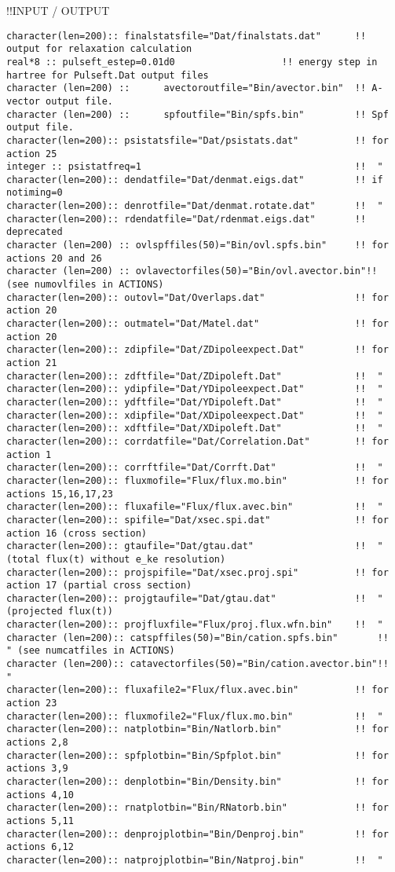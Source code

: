 !!{\large \quad INPUT / OUTPUT }
\begin{verbatim}
character(len=200):: finalstatsfile="Dat/finalstats.dat"      !! output for relaxation calculation
real*8 :: pulseft_estep=0.01d0                   !! energy step in hartree for Pulseft.Dat output files
character (len=200) ::      avectoroutfile="Bin/avector.bin"  !! A-vector output file.        
character (len=200) ::      spfoutfile="Bin/spfs.bin"         !! Spf output file.
character(len=200):: psistatsfile="Dat/psistats.dat"          !! for action 25
integer :: psistatfreq=1                                      !!  "
character(len=200):: dendatfile="Dat/denmat.eigs.dat"         !! if notiming=0
character(len=200):: denrotfile="Dat/denmat.rotate.dat"       !!  "
character(len=200):: rdendatfile="Dat/rdenmat.eigs.dat"       !! deprecated
character (len=200) :: ovlspffiles(50)="Bin/ovl.spfs.bin"     !! for actions 20 and 26 
character (len=200) :: ovlavectorfiles(50)="Bin/ovl.avector.bin"!!      (see numovlfiles in ACTIONS)
character(len=200):: outovl="Dat/Overlaps.dat"                !! for action 20
character(len=200):: outmatel="Dat/Matel.dat"                 !! for action 20
character(len=200):: zdipfile="Dat/ZDipoleexpect.Dat"         !! for action 21
character(len=200):: zdftfile="Dat/ZDipoleft.Dat"             !!  "
character(len=200):: ydipfile="Dat/YDipoleexpect.Dat"         !!  "
character(len=200):: ydftfile="Dat/YDipoleft.Dat"             !!  "
character(len=200):: xdipfile="Dat/XDipoleexpect.Dat"         !!  "
character(len=200):: xdftfile="Dat/XDipoleft.Dat"             !!  "
character(len=200):: corrdatfile="Dat/Correlation.Dat"        !! for action 1
character(len=200):: corrftfile="Dat/Corrft.Dat"              !!  "
character(len=200):: fluxmofile="Flux/flux.mo.bin"            !! for actions 15,16,17,23
character(len=200):: fluxafile="Flux/flux.avec.bin"           !!  "
character(len=200):: spifile="Dat/xsec.spi.dat"               !! for action 16 (cross section)
character(len=200):: gtaufile="Dat/gtau.dat"                  !!  " (total flux(t) without e_ke resolution)
character(len=200):: projspifile="Dat/xsec.proj.spi"          !! for action 17 (partial cross section)
character(len=200):: projgtaufile="Dat/gtau.dat"              !!  " (projected flux(t))
character(len=200):: projfluxfile="Flux/proj.flux.wfn.bin"    !!  "
character (len=200):: catspffiles(50)="Bin/cation.spfs.bin"       !!  " (see numcatfiles in ACTIONS)
character (len=200):: catavectorfiles(50)="Bin/cation.avector.bin"!!  "
character(len=200):: fluxafile2="Flux/flux.avec.bin"          !! for action 23
character(len=200):: fluxmofile2="Flux/flux.mo.bin"           !!  "
character(len=200):: natplotbin="Bin/Natlorb.bin"             !! for actions 2,8
character(len=200):: spfplotbin="Bin/Spfplot.bin"             !! for actions 3,9
character(len=200):: denplotbin="Bin/Density.bin"             !! for actions 4,10
character(len=200):: rnatplotbin="Bin/RNatorb.bin"            !! for actions 5,11
character(len=200):: denprojplotbin="Bin/Denproj.bin"         !! for actions 6,12
character(len=200):: natprojplotbin="Bin/Natproj.bin"         !!  "
\end{verbatim}
